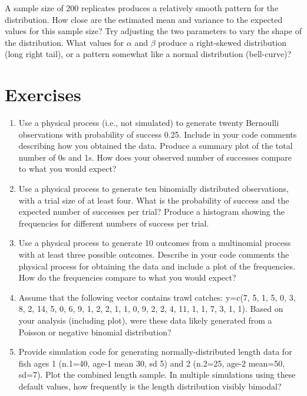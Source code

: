 \documentclass[
]{krantz}
\begin{document}
A sample size of 200 replicates produces a relatively smooth pattern for the distribution. How close are the estimated mean and variance to the expected values for this sample size? Try adjusting the two parameters to vary the shape of the distribution. What values for \(\alpha\) and \(\beta\) produce a right-skewed distribution (long right tail), or a pattern somewhat like a normal distribution (bell-curve)?

\hypertarget{exercises}{%
\section{Exercises}\label{exercises}}

\begin{enumerate}
\def\labelenumi{\arabic{enumi}.}
\item
  Use a physical process (i.e., not simulated) to generate twenty Bernoulli observations with probability of success 0.25. Include in your code comments describing how you obtained the data. Produce a summary plot of the total number of 0s and 1s. How does your observed number of successes compare to what you would expect?
\item
  Use a physical process to generate ten binomially distributed observations, with a trial size of at least four. What is the probability of success and the expected number of successes per trial? Produce a histogram showing the frequencies for different numbers of success per trial.
\item
  Use a physical process to generate 10 outcomes from a multinomial process with at least three possible outcomes. Describe in your code comments the physical process for obtaining the data and include a plot of the frequencies. How do the frequencies compare to what you would expect?
\item
  Assume that the following vector contains trawl catches: y=c(7, 5, 1, 5, 0, 3, 8, 2, 14, 5, 0, 6, 9, 1, 2, 2, 1, 1, 0, 9, 2, 2, 4, 11, 1, 1, 7, 3, 1, 1). Based on your analysis (including plot), were these data likely generated from a Poisson or negative binomial distribution?
\item
  Provide simulation code for generating normally-distributed length data for fish ages 1 (n.1=40, age-1 mean 30, sd 5) and 2 (n.2=25, age-2 mean=50, sd=7). Plot the combined length sample. In multiple simulations using these default values, how frequently is the length distribution visibly bimodal?
\end{enumerate}
\end{document}
